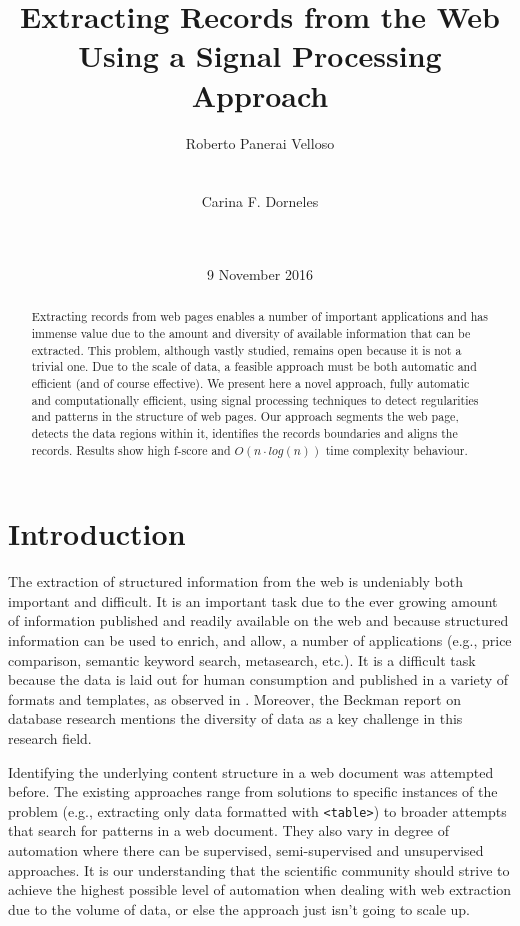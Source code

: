 \documentclass{vldb}
\title{Extracting Records from the Web Using a Signal Processing Approach}
\author{
\alignauthor
Roberto Panerai Velloso\\
       \affaddr{Universidade Federal de Santa Catarina}\\
       \affaddr{Florianópolis (SC), Brazil}\\
       \email{rvelloso@gmail.com}
\alignauthor
Carina F. Dorneles\\
       \affaddr{Universidade Federal de Santa Catarina}\\
       \affaddr{Florianópolis (SC), Brazil}\\
       \email{dorneles@inf.ufsc.br}
}
\date{9 November 2016}
\begin{document}

\maketitle

\begin{abstract}
Extracting records from web pages enables a number of important
applications and has immense value due to the amount and diversity of
available information that can be extracted. This problem, although vastly
studied, remains open because it is not a trivial one. Due to the scale of data,
a feasible approach must be both automatic and efficient (and of course
effective). We present here a novel approach, fully automatic and
computationally efficient, using signal processing techniques to detect
regularities and patterns in the structure of web pages. Our approach segments
the web page, detects the data regions within it, identifies the records
boundaries and aligns the records. Results show high f-score and
$O(n\cdot log(n))$ time complexity behaviour.
\end{abstract}

\section{Introduction}

The extraction of structured information from the web is undeniably both
important and difficult. It is an important task due to the ever growing amount
of information published and readily available on the web and because
structured information can be used to enrich, and allow, a number of
applications (e.g., price comparison, semantic keyword search, metasearch,
etc.).
It is a difficult task because the data is laid out for human consumption and
published in a variety of formats and templates, as observed in
\cite{structured2011}. Moreover, the Beckman report on database
research\cite{abadi2014beckman} mentions the diversity of data as a key
challenge in this research field.

Identifying the underlying content structure in a web document was attempted
before. The existing approaches range from solutions to specific instances of
the problem (e.g., extracting only data formatted with
\texttt{<table>}\cite{webtables2008}) to broader attempts that search for
patterns in a web document\cite{MDR03}. They also vary in degree of automation
where there can be supervised, semi-supervised and unsupervised approaches. It
is our understanding that the scientific community should strive to achieve the
highest possible level of automation when dealing with web extraction due
to the volume of data, or else the approach just isn't going to scale up.
\end{document}
